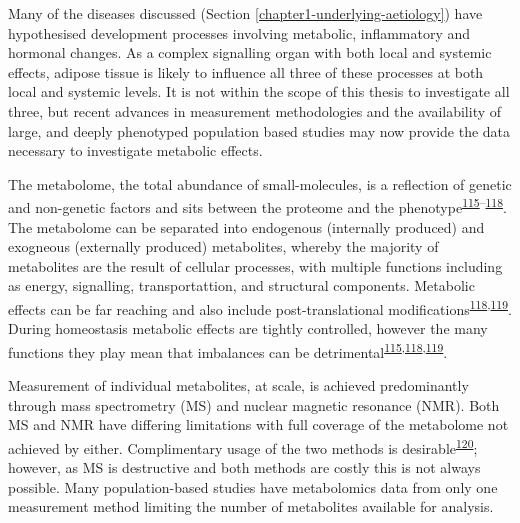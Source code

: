 \documentclass[11pt,twoside]{bristolthesis}
\begin{document}
Many of the diseases discussed (Section \ref{chapter1-underlying-aetiology}) have hypothesised development processes involving metabolic, inflammatory and hormonal changes. As a complex signalling organ with both local and systemic effects, adipose tissue is likely to influence all three of these processes at both local and systemic levels. It is not within the scope of this thesis to investigate all three, but recent advances in measurement methodologies and the availability of large, and deeply phenotyped population based studies may now provide the data necessary to investigate metabolic effects.

The metabolome, the total abundance of small-molecules, is a reflection of genetic and non-genetic factors and sits between the proteome and the phenotype\textsuperscript{\protect\hyperlink{ref-Griffin2006}{115}--\protect\hyperlink{ref-Wishart2019}{118}}. The metabolome can be separated into endogenous (internally produced) and exogneous (externally produced) metabolites, whereby the majority of metabolites are the result of cellular processes, with multiple functions including as energy, signalling, transportattion, and structural components. Metabolic effects can be far reaching and also include post-translational modifications\textsuperscript{\protect\hyperlink{ref-Wishart2019}{118},\protect\hyperlink{ref-Johnson2016}{119}}. During homeostasis metabolic effects are tightly controlled, however the many functions they play mean that imbalances can be detrimental\textsuperscript{\protect\hyperlink{ref-Griffin2006}{115},\protect\hyperlink{ref-Wishart2019}{118},\protect\hyperlink{ref-Johnson2016}{119}}.

Measurement of individual metabolites, at scale, is achieved predominantly through mass spectrometry (MS) and nuclear magnetic resonance (NMR). Both MS and NMR have differing limitations with full coverage of the metabolome not achieved by either. Complimentary usage of the two methods is desirable\textsuperscript{\protect\hyperlink{ref-Fearnley2016}{120}}; however, as MS is destructive and both methods are costly this is not always possible. Many population-based studies have metabolomics data from only one measurement method limiting the number of metabolites available for analysis.
\end{document}
